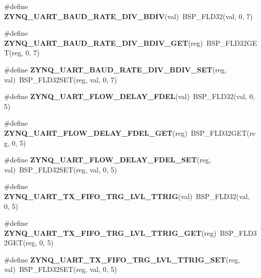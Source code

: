 \begin{DoxyCompactItemize}
\#define {\bfseries Z\+Y\+N\+Q\+\_\+\+U\+A\+R\+T\+\_\+\+B\+A\+U\+D\+\_\+\+R\+A\+T\+E\+\_\+\+D\+I\+V\+\_\+\+B\+D\+IV}(val)~B\+S\+P\+\_\+\+F\+L\+D32(val, 0, 7)
\item 
\mbox{\label{zynq-uart-regs_8h_a3fad3dc99d67a31f290756cfa41be525}} 
\#define {\bfseries Z\+Y\+N\+Q\+\_\+\+U\+A\+R\+T\+\_\+\+B\+A\+U\+D\+\_\+\+R\+A\+T\+E\+\_\+\+D\+I\+V\+\_\+\+B\+D\+I\+V\+\_\+\+G\+ET}(reg)~B\+S\+P\+\_\+\+F\+L\+D32\+G\+ET(reg, 0, 7)
\item 
\mbox{\label{zynq-uart-regs_8h_a031699c5ec793916e85a14566d0897e4}} 
\#define {\bfseries Z\+Y\+N\+Q\+\_\+\+U\+A\+R\+T\+\_\+\+B\+A\+U\+D\+\_\+\+R\+A\+T\+E\+\_\+\+D\+I\+V\+\_\+\+B\+D\+I\+V\+\_\+\+S\+ET}(reg,  val)~B\+S\+P\+\_\+\+F\+L\+D32\+S\+ET(reg, val, 0, 7)
\item 
\mbox{\label{zynq-uart-regs_8h_a48651e32a91d01ccb34a1cb9feee8896}} 
\#define {\bfseries Z\+Y\+N\+Q\+\_\+\+U\+A\+R\+T\+\_\+\+F\+L\+O\+W\+\_\+\+D\+E\+L\+A\+Y\+\_\+\+F\+D\+EL}(val)~B\+S\+P\+\_\+\+F\+L\+D32(val, 0, 5)
\item 
\mbox{\label{zynq-uart-regs_8h_a8e37fce8ba8bc610b24892e8ec52d6b3}} 
\#define {\bfseries Z\+Y\+N\+Q\+\_\+\+U\+A\+R\+T\+\_\+\+F\+L\+O\+W\+\_\+\+D\+E\+L\+A\+Y\+\_\+\+F\+D\+E\+L\+\_\+\+G\+ET}(reg)~B\+S\+P\+\_\+\+F\+L\+D32\+G\+ET(reg, 0, 5)
\item 
\mbox{\label{zynq-uart-regs_8h_a3a3862498806d7fd1a5812d859ac485b}} 
\#define {\bfseries Z\+Y\+N\+Q\+\_\+\+U\+A\+R\+T\+\_\+\+F\+L\+O\+W\+\_\+\+D\+E\+L\+A\+Y\+\_\+\+F\+D\+E\+L\+\_\+\+S\+ET}(reg,  val)~B\+S\+P\+\_\+\+F\+L\+D32\+S\+ET(reg, val, 0, 5)
\item 
\mbox{\label{zynq-uart-regs_8h_a998c218723a18af6c6afe10d289fbf8e}} 
\#define {\bfseries Z\+Y\+N\+Q\+\_\+\+U\+A\+R\+T\+\_\+\+T\+X\+\_\+\+F\+I\+F\+O\+\_\+\+T\+R\+G\+\_\+\+L\+V\+L\+\_\+\+T\+T\+R\+IG}(val)~B\+S\+P\+\_\+\+F\+L\+D32(val, 0, 5)
\item 
\mbox{\label{zynq-uart-regs_8h_a5554192a6f34f6fc02369aa2ca8d84ad}} 
\#define {\bfseries Z\+Y\+N\+Q\+\_\+\+U\+A\+R\+T\+\_\+\+T\+X\+\_\+\+F\+I\+F\+O\+\_\+\+T\+R\+G\+\_\+\+L\+V\+L\+\_\+\+T\+T\+R\+I\+G\+\_\+\+G\+ET}(reg)~B\+S\+P\+\_\+\+F\+L\+D32\+G\+ET(reg, 0, 5)
\item 
\mbox{\label{zynq-uart-regs_8h_ae0d7589f662b589a38363819b3c499e8}} 
\#define {\bfseries Z\+Y\+N\+Q\+\_\+\+U\+A\+R\+T\+\_\+\+T\+X\+\_\+\+F\+I\+F\+O\+\_\+\+T\+R\+G\+\_\+\+L\+V\+L\+\_\+\+T\+T\+R\+I\+G\+\_\+\+S\+ET}(reg,  val)~B\+S\+P\+\_\+\+F\+L\+D32\+S\+ET(reg, val, 0, 5)
\end{DoxyCompactItemize}
